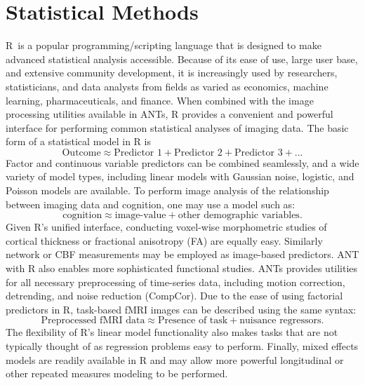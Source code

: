 
\section{Statistical Methods}\label{sec:R}
R~is a popular
programming/scripting language that is designed to make advanced
statistical analysis accessible.  Because of its ease of use, large user base, and
extensive community development, it is increasingly used by
researchers, statisticians, and data analysts from fields as varied as
economics, machine learning, pharmaceuticals, and finance. When
combined with the image processing utilities available in ANTs, R
provides a convenient and powerful interface for performing common
statistical analyses of imaging data.  The basic form of a statistical model in R is 
\begin{equation}
\text{Outcome} \approx \text{Predictor 1} + \text{Predictor 2} + \text{Predictor 3} + ...
\label{eqn:r_syntax}
\end{equation}
Factor and continuous variable predictors can be combined seamlessly,
and a wide variety of model types, including linear models with
Gaussian noise, logistic, and Poisson models are available.  To
perform image analysis of the relationship between imaging data and
cognition,  one may use a model such as:
\begin{equation}
\text{cognition} \approx \text{image-value} + \text{other demographic variables}. 
\label{eqn:ROI}
\end{equation}
Given R's unified interface, conducting voxel-wise morphometric
studies of cortical thickness or fractional anisotropy (FA) are
equally easy.  Similarly network or CBF measurements may be employed
as image-based predictors.  ANT with R also enables more sophisticated functional studies.  ANTs provides utilities for all necessary preprocessing of time-series data, including motion correction, detrending, and noise reduction (CompCor).  Due to the ease of using factorial predictors in R, task-based fMRI images can be described using the same syntax: 
\begin{equation}
\text{Preprocessed fMRI data} \approx \text{Presence of task} + \text{nuisance regressors}.
\label{eqn:fmri}
\end{equation}
The flexibility of R's linear model functionality also makes tasks
that are not typically thought of as regression problems easy to
perform. Finally, mixed effects models are readily available in R and
may allow more powerful longitudinal or other repeated measures modeling
to be performed. 